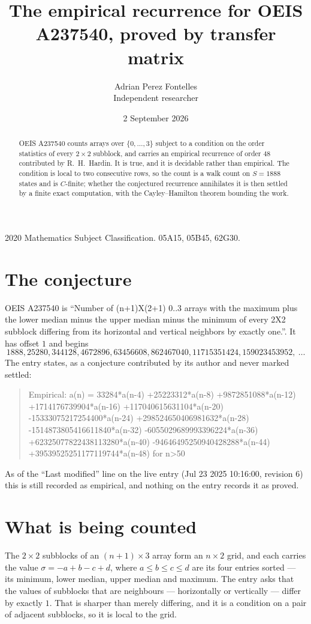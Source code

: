 \documentclass[11pt,a4paper]{article}
\title{The empirical recurrence for OEIS A237540, proved by transfer matrix}
\author{Adrian Perez Fontelles\\ \small Independent researcher}
\date{2 September 2026}
\theoremstyle{plain}
\theoremstyle{definition}
\begin{document}
\maketitle

\begin{abstract}
OEIS A237540 counts arrays over $\{0,\dots,3\}$ subject to a condition on the order
statistics of every $2\times2$ subblock, and carries an empirical recurrence of order
$48$ contributed by R.~H.~Hardin. It is true, and it is decidable rather than empirical.
The condition is local to two consecutive rows, so the count is a walk count on $S=1888$
states and is $C$-finite; whether the conjectured recurrence annihilates it is then settled by
a finite exact computation, with the Cayley--Hamilton theorem bounding the work.
\end{abstract}

\noindent\small 2020 Mathematics Subject Classification. 05A15, 05B45, 62G30.\normalsize

\section{The conjecture}

OEIS A237540 is ``Number of (n+1)X(2+1) 0..3 arrays with the maximum plus the lower median minus the upper median minus the minimum of every 2X2 subblock differing from its horizontal and vertical neighbors by exactly one.''. It has offset $1$ and begins
\[
1888, 25280, 344128, 4672896, 63456608, 862467040, 11715351424, 159023453952,\ \dots
\]
The entry states, as a conjecture contributed by its author and never marked settled:
\begin{quote}
Empirical: a(n) = 33284*a(n-4) +25223312*a(n-8) +9872851088*a(n-12) +1714176739904*a(n-16) +117040615631104*a(n-20) -15333075217254400*a(n-24) +298524650406981632*a(n-28) -1514873805416611840*a(n-32) -6055029689993396224*a(n-36) +62325077822438113280*a(n-40) -94646495250940428288*a(n-44) +39539525251177119744*a(n-48) for n>50
\end{quote}
As of the ``Last modified'' line on the live entry (Jul 23 2025 10:16:00, revision 6) this is still
recorded as empirical, and nothing on the entry records it as proved.

\section{What is being counted}

The $2\times2$ subblocks of an $(n+1)\times3$ array form an
$n\times2$ grid, and each carries the value $\sigma=-a+b-c+d$, where $a\le b\le c\le d$ are its four entries sorted --- its minimum, lower median, upper median and maximum. The entry asks that the values of
subblocks that are neighbours --- horizontally or vertically --- differ by exactly $1$.
That is sharper than merely differing, and it is a condition on a pair of adjacent subblocks,
so it is local to the grid.
\end{document}
